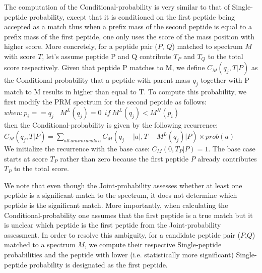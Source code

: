 \documentclass[runningheads,a4paper]{llncs}
\begin{document}
The computation of the Conditional-probability is very similar to that of Single-peptide probability, except that it is conditioned on the first peptide being accepted as a match thus when a prefix mass of the second peptide is equal to a prefix mass of the first peptide, one only uses the score of the mass position with higher score.  More concretely, for a peptide pair ($P$, $Q$) matched to spectrum $M$ with score $T$, let's assume peptide P and Q contribute $T_{P}$ and $T_{Q}$ to the total score respectively. Given that peptide P matches to M, we define $C_M(q_{j}, T | P)$ as the Conditional-probability that a peptide with parent mass $q_{j}$ together with P match to M results in higher than equal to T. To compute this probability, we first modify the PRM spectrum for the second peptide as follows:
$when: p_{i} == q_{j}\ \ \ \ M^{L}(q_{j}) = 0\ \ if\ M^{L}(q_{j}) < M^{H}(p_{i})$ \\
then the Conditional-probability is given by the following recurrence: \\
\vspace{2cm}
$C_M(q_{j},T | P) = \sum\limits_{all\ amino\ acids\ a}{C_M(q_{j} - |a|, T - M^{L}(q_{j}) | P)}\times prob(a)$ \\
We initialize the recurrence with the base case: $C_M(0, T_{P} | P) = 1$.  The base case starts at score $T_{P}$ rather than zero because the first peptide $P$ already contributes $T_{P}$ to the total score.

We note that even though the Joint-probability assesses whether at least one peptide is a significant match to the spectrum, it does not determine which peptide is the significant match.  More importantly, when calculating the Conditional-probability one assumes that the first peptide is a true match but it is unclear which peptide is the first peptide from the Joint-probability assessment. In order to resolve this ambiguity, for a candidate peptide pair ($P$,$Q$) matched to a spectrum $M$, we compute their respective Single-peptide probabilities and the peptide with lower (i.e. statistically more significant) Single-peptide probability is designated as the first peptide.
\end{document}
